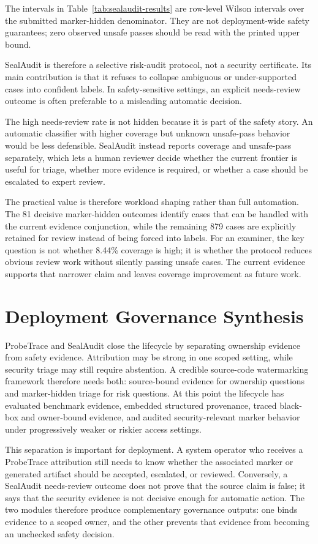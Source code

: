 The intervals in Table~\ref{tab:sealaudit-results} are row-level Wilson intervals over the submitted marker-hidden denominator. They are not deployment-wide safety guarantees; zero observed unsafe passes should be read with the printed upper bound.

SealAudit is therefore a selective risk-audit protocol, not a security certificate. Its main contribution is that it refuses to collapse ambiguous or under-supported cases into confident labels. In safety-sensitive settings, an explicit needs-review outcome is often preferable to a misleading automatic decision.

The high needs-review rate is not hidden because it is part of the safety story. An automatic classifier with higher coverage but unknown unsafe-pass behavior would be less defensible. SealAudit instead reports coverage and unsafe-pass separately, which lets a human reviewer decide whether the current frontier is useful for triage, whether more evidence is required, or whether a case should be escalated to expert review.

The practical value is therefore workload shaping rather than full automation. The 81 decisive marker-hidden outcomes identify cases that can be handled with the current evidence conjunction, while the remaining 879 cases are explicitly retained for review instead of being forced into labels. For an examiner, the key question is not whether 8.44\% coverage is high; it is whether the protocol reduces obvious review work without silently passing unsafe cases. The current evidence supports that narrower claim and leaves coverage improvement as future work.

\section{Deployment Governance Synthesis}

ProbeTrace and SealAudit close the lifecycle by separating ownership evidence from safety evidence. Attribution may be strong in one scoped setting, while security triage may still require abstention. A credible source-code watermarking framework therefore needs both: source-bound evidence for ownership questions and marker-hidden triage for risk questions.
At this point the lifecycle has evaluated benchmark evidence, embedded structured provenance, traced black-box and owner-bound evidence, and audited security-relevant marker behavior under progressively weaker or riskier access settings.

This separation is important for deployment. A system operator who receives a ProbeTrace attribution still needs to know whether the associated marker or generated artifact should be accepted, escalated, or reviewed. Conversely, a SealAudit needs-review outcome does not prove that the source claim is false; it says that the security evidence is not decisive enough for automatic action. The two modules therefore produce complementary governance outputs: one binds evidence to a scoped owner, and the other prevents that evidence from becoming an unchecked safety decision.

